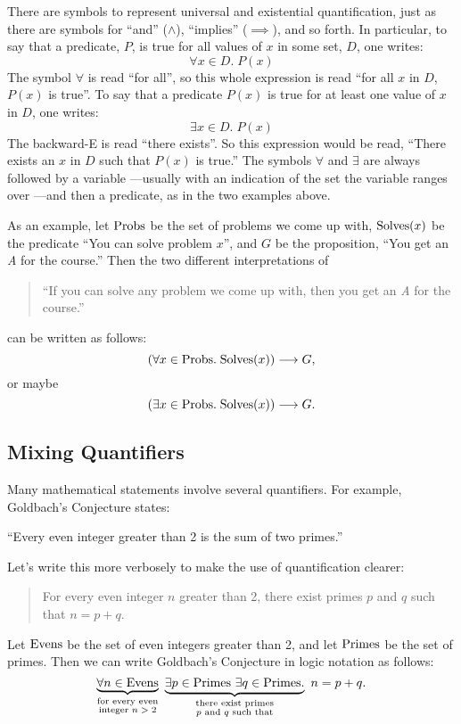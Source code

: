 There are symbols to represent universal and existential
quantification, just as there are symbols for ``and'' ($\wedge$),
``implies'' ($\implies$), and so forth.  In particular, to say that a
predicate, $P$, is true for all values of $x$ in some set, $D$, one
writes:
%
\[
\forall x \in D.\; P(x)
\]
%
The symbol $\forall$ is read ``for all'', so this whole expression is
read ``for all $x$ in $D$, $P(x)$ is true''.  To say that a predicate
$P(x)$ is true for at least one value of $x$ in $D$, one writes:
%
\[
\exists x \in D.\; P(x)
\]
%
The backward-E is read ``there exists''.  So this expression would be
read, ``There exists an $x$ in $D$ such that $P(x)$ is true.''  The
symbols $\forall$ and $\exists$ are always followed by a variable
---usually with an indication of the set the variable ranges over ---and
then a predicate, as in the two examples above.

As an example, let $\text{Probs}$ be the set of problems we come up with,
$\text{Solves}(x)$ be the predicate ``You can solve problem $x$'', and $G$ be
the proposition, ``You get an \emph{A} for the course.''  Then the two
different interpretations of
%
\begin{quote}
``If you can solve any problem we come up with, then you get an \emph{A} for the course.''
\end{quote}
%
can be written as follows:
%
\[
(\forall x \in \text{Probs}.\; \text{Solves}(x)) \longrightarrow G,
\]
or maybe
\[
(\exists x \in \text{Probs}.\; \text{Solves}(x)) \longrightarrow G.
\]

\subsection{Mixing Quantifiers}

Many mathematical statements involve several quantifiers.  For
example, Goldbach's Conjecture states:
%
\begin{center}
``Every even integer greater than 2 is the sum of two primes.''
\end{center}
%
Let's write this more verbosely to make the use of quantification
clearer:
%
\begin{quote}
For every even integer $n$ greater than 2,
there exist primes $p$ and $q$ such that $n = p + q$.
\end{quote}
%
Let $\text{Evens}$ be the set of even integers greater than 2, and let $\text{Primes}$ be the
set of primes.  Then we can write Goldbach's Conjecture in logic
notation as follows:
%
\[
\underbrace{\forall n \in \text{Evens}}_{\substack
    {\text{for every even} \\
     \text{integer $n > 2$}}}
\
\underbrace{\exists p \in \text{Primes}\ \exists q \in \text{Primes}.}_{\substack
    {\text{there exist primes} \\
     \text{$p$ and $q$ such that}}}
\ n = p + q.
\]


